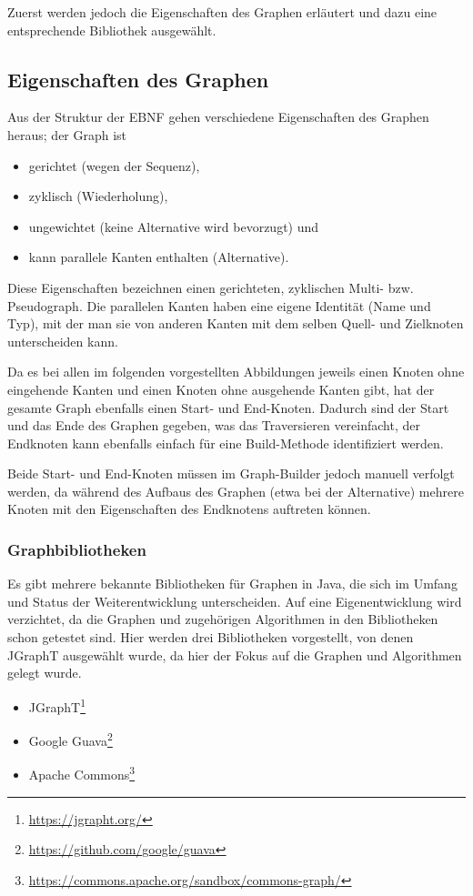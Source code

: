 \documentclass[../InterneDSLs.tex]{subfiles}
\begin{document}
Zuerst werden jedoch die Eigenschaften des Graphen erläutert und dazu eine entsprechende Bibliothek ausgewählt.

\subsection{Eigenschaften des Graphen}
Aus der Struktur der EBNF gehen verschiedene Eigenschaften des Graphen heraus; der Graph ist
\begin{itemize}
	\item gerichtet (wegen der Sequenz),
	\item zyklisch (Wiederholung),
	\item ungewichtet (keine Alternative wird bevorzugt) und
	\item kann parallele Kanten enthalten (Alternative).
\end{itemize}
Diese Eigenschaften bezeichnen einen gerichteten, zyklischen Multi- bzw. Pseudograph. Die parallelen Kanten haben eine eigene Identität (Name und Typ), mit der man sie von anderen Kanten mit dem selben Quell- und Zielknoten unterscheiden kann.

Da es bei allen im folgenden vorgestellten Abbildungen jeweils einen Knoten ohne eingehende Kanten und einen Knoten ohne ausgehende Kanten gibt, hat der gesamte Graph ebenfalls einen Start- und End-Knoten. Dadurch sind der Start und das Ende des Graphen gegeben, was das Traversieren vereinfacht, der Endknoten kann ebenfalls einfach für eine Build-Methode identifiziert werden.

Beide Start- und End-Knoten müssen im Graph-Builder jedoch manuell verfolgt werden, da während des Aufbaus des Graphen (etwa bei der Alternative) mehrere Knoten mit den Eigenschaften des Endknotens auftreten können.

\subsubsection{Graphbibliotheken}
Es gibt mehrere bekannte Bibliotheken für Graphen in Java, die sich im Umfang und Status der Weiterentwicklung unterscheiden. Auf eine Eigenentwicklung wird verzichtet, da die Graphen und zugehörigen Algorithmen in den Bibliotheken schon getestet sind. Hier werden drei Bibliotheken vorgestellt, von denen JGraphT ausgewählt wurde, da hier der Fokus auf die Graphen und Algorithmen gelegt wurde.
\begin{itemize}
	\item JGraphT\footnote{\url{https://jgrapht.org/}}
	\item Google Guava\footnote{\url{https://github.com/google/guava}}
	\item Apache Commons\footnote{\url{https://commons.apache.org/sandbox/commons-graph/}}
\end{itemize}
\end{document}
